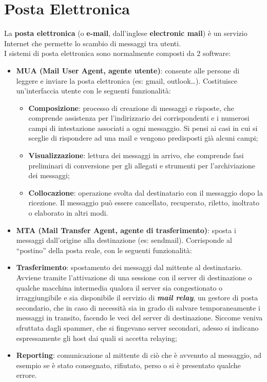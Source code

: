 \section{Posta Elettronica}
    La \textbf{posta elettronica} (o \textbf{e-mail}, dall’inglese \textbf{electronic mail}) è un servizio Internet che
    permette lo scambio di messaggi tra utenti.\\

    I sistemi di posta elettronica sono normalmente composti da 2 software:

    \begin{itemize}
        \item \textbf{MUA (Mail User Agent, agente utente)}: consente alle persone di leggere e inviare la 
        posta elettronica (es: gmail, outlook…).
        Costituisce un’interfaccia utente con le seguenti funzionalità:
        \begin{itemize}
            \item \textbf{Composizione}: processo di creazione di messaggi e risposte, che comprende
            assistenza per l’indirizzario dei corrispondenti e i numerosi campi di
            intestazione associati a ogni messaggio. Si pensi ai casi in cui si sceglie di
            rispondere ad una mail e vengono predisposti già alcuni campi;
            \item \textbf{Visualizzazione}: lettura dei messaggi in arrivo, che comprende fasi preliminari
            di conversione per gli allegati e strumenti per l’archiviazione dei messaggi;
            \item \textbf{Collocazione}: operazione svolta dal destinatario con il messaggio dopo la
            ricezione. Il messaggio può essere cancellato, recuperato, riletto, inoltrato o
            elaborato in altri modi.
        \end{itemize}

        \item \textbf{MTA (Mail Transfer Agent, agente di trasferimento)}: sposta i messaggi dall’origine
        alla destinazione (es: sendmail).
        Corrisponde al “postino” della posta reale, con le seguenti funzionalità: %
        \item \textbf{Trasferimento}: spostamento dei messaggi dal mittente al destinatario. Avviene
        tramite l’attivazione di una sessione con il server di destinazione o qualche
        macchina intermedia qualora il server sia congestionato o irraggiungibile e sia
        disponibile il servizio di \textbf{\textit{mail relay}}, un gestore di posta secondario, che in caso
        di necessità sia in grado di salvare temporaneamente i messaggi in transito,
        facendo le veci del server di destinazione. Siccome veniva sfruttata dagli
        spammer, che si fingevano server secondari, adesso si indicano espressamente
        gli host dai quali si accetta relaying;
        \item \textbf{Reporting}: comunicazione al mittente di ciò che è avvenuto al messaggio, ad
        esempio se è stato consegnato, rifiutato, perso o si è presentato qualche errore.
    \end{itemize}

